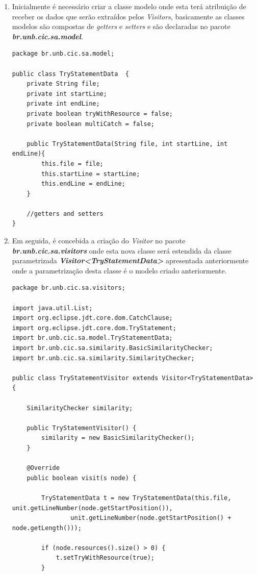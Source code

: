 	\begin{enumerate}
		\item Inicialmente é necessário criar a classe modelo onde esta terá atribuição de receber os dados que serão extraídos pelos \textit{Visitors}, basicamente as classes modelos são compostas de \textit{getters} e \textit{setters} e são declaradas no pacote  \textit{\textbf{br.unb.cic.sa.model}}.
			\begin{lstlisting}
package br.unb.cic.sa.model;

public class TryStatementData  {
	private String file;
	private int startLine;
	private int endLine;
	private boolean tryWithResource = false;
	private boolean multiCatch = false;
	
	public TryStatementData(String file, int startLine, int endLine){
		this.file = file;
		this.startLine = startLine;
		this.endLine = endLine;
	}
	
	//getters and setters
}
			\end{lstlisting}
			
			
		\item Em seguida, é concebida a criação do \textit{Visitor} no pacote \textit{\textbf{br.unb.cic.sa.visitors}} onde esta nova classe será estendida da classe parametrizada \textit{\textbf{Visitor<TryStatementData>}} apresentada anteriormente onde a parametrização desta classe é o modelo criado anteriormente.
			
			\begin{lstlisting}
package br.unb.cic.sa.visitors;

import java.util.List;
import org.eclipse.jdt.core.dom.CatchClause;
import org.eclipse.jdt.core.dom.TryStatement;
import br.unb.cic.sa.model.TryStatementData;
import br.unb.cic.sa.similarity.BasicSimilarityChecker;
import br.unb.cic.sa.similarity.SimilarityChecker;

public class TryStatementVisitor extends Visitor<TryStatementData> {

	SimilarityChecker similarity;

	public TryStatementVisitor() {
		similarity = new BasicSimilarityChecker();
	}

	@Override
	public boolean visit(s node) {

		TryStatementData t = new TryStatementData(this.file, unit.getLineNumber(node.getStartPosition()),
				unit.getLineNumber(node.getStartPosition() + node.getLength()));
		
		if (node.resources().size() > 0) {
			t.setTryWithResource(true);
		}
	

\end{lstlisting}
\end{enumerate}
